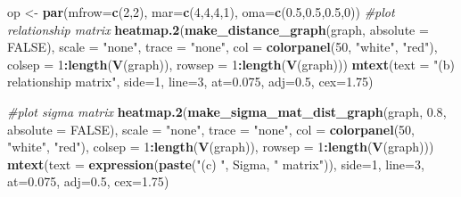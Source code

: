 \documentclass[]{article}
\newenvironment{Shaded}{\begin{snugshade}}{\end{snugshade}}
\newcommand{\CommentTok}[1]{\textcolor[rgb]{0.56,0.35,0.01}{\textit{#1}}}
\newcommand{\DataTypeTok}[1]{\textcolor[rgb]{0.13,0.29,0.53}{#1}}
\newcommand{\DecValTok}[1]{\textcolor[rgb]{0.00,0.00,0.81}{#1}}
\newcommand{\FloatTok}[1]{\textcolor[rgb]{0.00,0.00,0.81}{#1}}
\newcommand{\KeywordTok}[1]{\textcolor[rgb]{0.13,0.29,0.53}{\textbf{#1}}}
\newcommand{\NormalTok}[1]{#1}
\newcommand{\OperatorTok}[1]{\textcolor[rgb]{0.81,0.36,0.00}{\textbf{#1}}}
\newcommand{\OtherTok}[1]{\textcolor[rgb]{0.56,0.35,0.01}{#1}}
\newcommand{\StringTok}[1]{\textcolor[rgb]{0.31,0.60,0.02}{#1}}
\begin{document}
\begin{Shaded}
\begin{Highlighting}[]
\NormalTok{op <-}\StringTok{ }\KeywordTok{par}\NormalTok{(}\DataTypeTok{mfrow=}\KeywordTok{c}\NormalTok{(}\DecValTok{2}\NormalTok{,}\DecValTok{2}\NormalTok{), }\DataTypeTok{mar=}\KeywordTok{c}\NormalTok{(}\DecValTok{4}\NormalTok{,}\DecValTok{4}\NormalTok{,}\DecValTok{4}\NormalTok{,}\DecValTok{1}\NormalTok{), }\DataTypeTok{oma=}\KeywordTok{c}\NormalTok{(}\FloatTok{0.5}\NormalTok{,}\FloatTok{0.5}\NormalTok{,}\FloatTok{0.5}\NormalTok{,}\DecValTok{0}\NormalTok{))}
\CommentTok{#plot relationship matrix}
\KeywordTok{heatmap.2}\NormalTok{(}\KeywordTok{make_distance_graph}\NormalTok{(graph, }\DataTypeTok{absolute =} \OtherTok{FALSE}\NormalTok{),}
          \DataTypeTok{scale =} \StringTok{"none"}\NormalTok{, }\DataTypeTok{trace =} \StringTok{"none"}\NormalTok{, }\DataTypeTok{col =} \KeywordTok{colorpanel}\NormalTok{(}\DecValTok{50}\NormalTok{, }\StringTok{"white"}\NormalTok{, }\StringTok{"red"}\NormalTok{),}
\DataTypeTok{colsep =} \DecValTok{1}\OperatorTok{:}\KeywordTok{length}\NormalTok{(}\KeywordTok{V}\NormalTok{(graph)), }\DataTypeTok{rowsep =} \DecValTok{1}\OperatorTok{:}\KeywordTok{length}\NormalTok{(}\KeywordTok{V}\NormalTok{(graph)))}
\KeywordTok{mtext}\NormalTok{(}\DataTypeTok{text =} \StringTok{"(b) relationship matrix"}\NormalTok{, }\DataTypeTok{side=}\DecValTok{1}\NormalTok{, }\DataTypeTok{line=}\DecValTok{3}\NormalTok{, }\DataTypeTok{at=}\FloatTok{0.075}\NormalTok{, }\DataTypeTok{adj=}\FloatTok{0.5}\NormalTok{, }\DataTypeTok{cex=}\FloatTok{1.75}\NormalTok{)}

\CommentTok{#plot sigma matrix}
\KeywordTok{heatmap.2}\NormalTok{(}\KeywordTok{make_sigma_mat_dist_graph}\NormalTok{(graph, }\FloatTok{0.8}\NormalTok{, }\DataTypeTok{absolute =} \OtherTok{FALSE}\NormalTok{),}
\DataTypeTok{scale =} \StringTok{"none"}\NormalTok{, }\DataTypeTok{trace =} \StringTok{"none"}\NormalTok{, }\DataTypeTok{col =} \KeywordTok{colorpanel}\NormalTok{(}\DecValTok{50}\NormalTok{, }\StringTok{"white"}\NormalTok{, }\StringTok{"red"}\NormalTok{),}
\DataTypeTok{colsep =} \DecValTok{1}\OperatorTok{:}\KeywordTok{length}\NormalTok{(}\KeywordTok{V}\NormalTok{(graph)), }\DataTypeTok{rowsep =} \DecValTok{1}\OperatorTok{:}\KeywordTok{length}\NormalTok{(}\KeywordTok{V}\NormalTok{(graph)))}
\KeywordTok{mtext}\NormalTok{(}\DataTypeTok{text =} \KeywordTok{expression}\NormalTok{(}\KeywordTok{paste}\NormalTok{(}\StringTok{"(c) "}\NormalTok{, Sigma, }\StringTok{" matrix"}\NormalTok{)), }\DataTypeTok{side=}\DecValTok{1}\NormalTok{, }\DataTypeTok{line=}\DecValTok{3}\NormalTok{, }\DataTypeTok{at=}\FloatTok{0.075}\NormalTok{, }\DataTypeTok{adj=}\FloatTok{0.5}\NormalTok{, }\DataTypeTok{cex=}\FloatTok{1.75}\NormalTok{)}


\end{Highlighting}
\end{Shaded}
\end{document}
